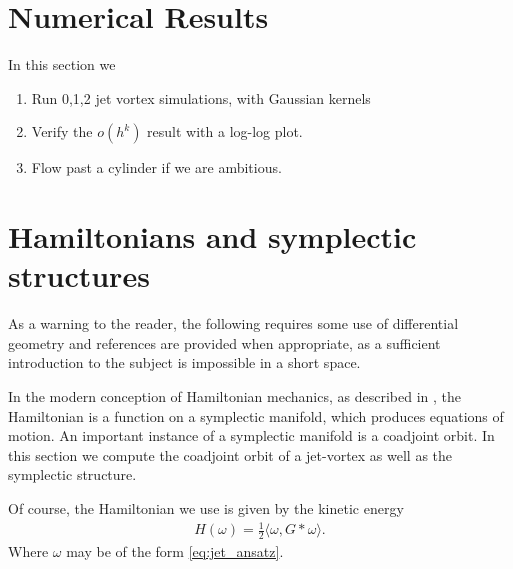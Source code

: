 \documentclass[12pt]{amsart}
\begin{document}
\section{Numerical Results}
\label{sec:numerics}
In this section we
\begin{enumerate}
	\item Run 0,1,2 jet vortex simulations, with Gaussian kernels
	\item Verify the $o(h^k)$ result with a log-log plot.
	\item Flow past a cylinder if we are ambitious.
\end{enumerate}


\section{Hamiltonians and symplectic structures}
\label{sec:symplectic}

As a warning to the reader, the following requires some use of differential geometry
and references are provided when appropriate, as a sufficient introduction to the subject is impossible in a short space.

In the modern conception of Hamiltonian mechanics, as described in \cite{FOM,Arnold2000},
the Hamiltonian is a function on a symplectic manifold, which produces equations of motion.
An important instance of a symplectic manifold is a coadjoint orbit.
In this section we compute the coadjoint orbit of a jet-vortex
as well as the symplectic structure.

Of course, the Hamiltonian we use is given by
the kinetic energy
\begin{align*}
  H(\omega) = \frac{1}{2} \langle \omega , G* \omega \rangle.
\end{align*}
Where $\omega$ may be of the form \eqref{eq:jet_ansatz}.
\end{document}
